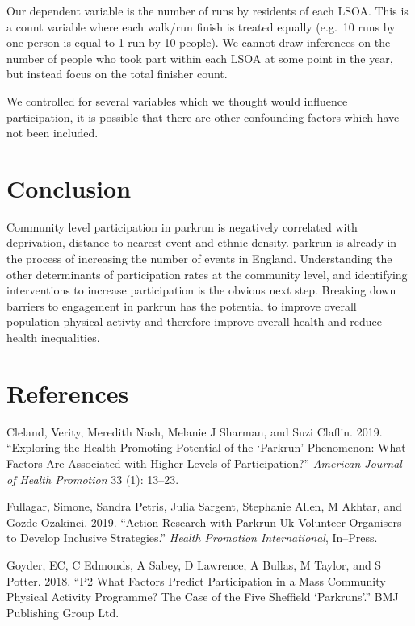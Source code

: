 \documentclass[]{article}
\begin{document}
Our dependent variable is the number of runs by residents of each LSOA.
This is a count variable where each walk/run finish is treated equally
(e.g.~10 runs by one person is equal to 1 run by 10 people). We cannot
draw inferences on the number of people who took part within each LSOA
at some point in the year, but instead focus on the total finisher
count.

We controlled for several variables which we thought would influence
participation, it is possible that there are other confounding factors
which have not been included.

\hypertarget{conclusion}{%
\section{Conclusion}\label{conclusion}}

Community level participation in parkrun is negatively correlated with
deprivation, distance to nearest event and ethnic density. parkrun is
already in the process of increasing the number of events in England.
Understanding the other determinants of participation rates at the
community level, and identifying interventions to increase participation
is the obvious next step. Breaking down barriers to engagement in
parkrun has the potential to improve overall population physical activty
and therefore improve overall health and reduce health inequalities.

\hypertarget{references}{%
\section*{References}\label{references}}

\hypertarget{refs}{}
\leavevmode\hypertarget{ref-cleland2019exploring}{}%
Cleland, Verity, Meredith Nash, Melanie J Sharman, and Suzi Claflin.
2019. ``Exploring the Health-Promoting Potential of the `Parkrun'
Phenomenon: What Factors Are Associated with Higher Levels of
Participation?'' \emph{American Journal of Health Promotion} 33 (1):
13--23.

\leavevmode\hypertarget{ref-fullagar2019action}{}%
Fullagar, Simone, Sandra Petris, Julia Sargent, Stephanie Allen, M
Akhtar, and Gozde Ozakinci. 2019. ``Action Research with Parkrun Uk
Volunteer Organisers to Develop Inclusive Strategies.'' \emph{Health
Promotion International}, In--Press.

\leavevmode\hypertarget{ref-goyder2018p2}{}%
Goyder, EC, C Edmonds, A Sabey, D Lawrence, A Bullas, M Taylor, and S
Potter. 2018. ``P2 What Factors Predict Participation in a Mass
Community Physical Activity Programme? The Case of the Five Sheffield
`Parkruns'.'' BMJ Publishing Group Ltd.
\end{document}
